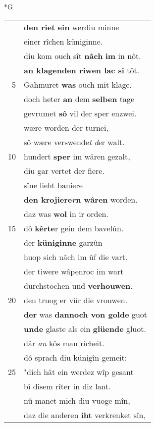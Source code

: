 \documentclass[8pt,a4paper,notitlepage]{article}
\begin{document}
\begin{table}[ht]
\begin{minipage}[t]{0.5\linewidth}
\small
\begin{center}*G
\end{center}
\begin{tabular}{rl}
 & \textbf{den riet} \textbf{ein} werdiu minne\\ 
 & einer rîchen küniginne.\\ 
 & diu kom ouch sît \textbf{nâch} \textbf{im} in nôt.\\ 
 & \textbf{an klagenden riwen lac si} tôt.\\ 
5 & Gahmuret \textbf{was} ouch mit klage.\\ 
 & doch heter \textbf{an} dem \textbf{selben} tage\\ 
 & gevrumet \textbf{sô} vil der sper enzwei.\\ 
 & wære worden der turnei,\\ 
 & sô wære verswende\textit{t} \textit{d}er walt.\\ 
10 & hundert \textbf{sper} im wâren gezalt,\\ 
 & diu gar vertet der fiere.\\ 
 & sîne lieht baniere\\ 
 & \textbf{den krojiere\textit{r}n wâren} worden.\\ 
 & daz was \textbf{wol} in ir orden.\\ 
15 & dô \textbf{kêrte}r gein dem bavelûn.\\ 
 & der \textbf{küniginne} garzûn\\ 
 & huop sich nâch im ûf die vart.\\ 
 & der tiwere wâpenroc im wart\\ 
 & durchstochen und \textbf{verhouwen}.\\ 
20 & den truog er vür die vrouwen.\\ 
 & \textbf{der} was \textbf{dannoch von golde} guot\\ 
 & \textbf{unde} glaste als ein \textbf{glüende} gluot.\\ 
 & dâr \textit{an} kôs man rîcheit.\\ 
 & dô sprach diu künigîn gemeit:\\ 
25 & "dich hât ein werdez wîp gesant\\ 
 & bî disem rîter in diz lant.\\ 
 & nû manet mich diu vuoge mîn,\\ 
 & daz die anderen \textbf{iht} verkrenket sîn,\\ 

\end{tabular}
\end{minipage}
\end{table}
\end{document}
